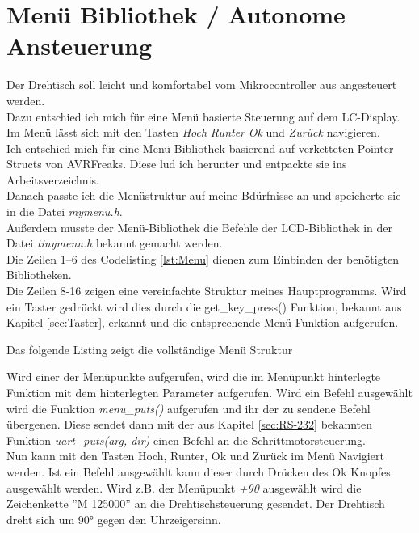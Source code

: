 \section{Menü Bibliothek / Autonome Ansteuerung}
Der Drehtisch soll leicht und komfortabel vom Mikrocontroller aus angesteuert werden.\\
Dazu entschied ich mich für eine Menü basierte Steuerung auf dem LC-Display. Im Menü lässt sich mit den Tasten \emph{Hoch} \emph{Runter} \emph{Ok} und \emph{Zurück} navigieren.\\
Ich entschied mich für eine Menü Bibliothek basierend auf verketteten Pointer Structs von AVRFreaks\cite{AVRFreaks:Menu}. Diese lud ich herunter und entpackte sie ins Arbeitsverzeichnis.\\
Danach passte ich die Menüstruktur auf meine Bdürfnisse an und speicherte sie in die Datei \emph{mymenu.h}.\\
Außerdem musste der Menü-Bibliothek die Befehle der LCD-Bibliothek in der Datei \emph{tinymenu.h} bekannt gemacht werden.\\
Die Zeilen 1--6 des Codelisting \ref{lst:Menu} dienen zum Einbinden der benötigten Bibliotheken.\\
Die Zeilen 8-16 zeigen eine vereinfachte Struktur meines  Hauptprogramms. Wird ein Taster gedrückt wird dies durch die get\_key\_press() Funktion, bekannt aus Kapitel \ref{sec:Taster}, erkannt und die entsprechende Menü Funktion aufgerufen.
\lstset{language=C, basicstyle=\footnotesize, showstringspaces=false, tabsize=8}

Das folgende Listing zeigt die vollständige Menü Struktur
\lstset{language=C, basicstyle=\footnotesize, showstringspaces=false, tabsize=8}

Wird einer der Menüpunkte aufgerufen, wird die im Menüpunkt hinterlegte Funktion mit dem hinterlegten Parameter aufgerufen.
Wird ein Befehl ausgewählt wird die Funktion \emph{menu\_puts()} aufgerufen und ihr der zu sendene Befehl übergenen. Diese sendet dann mit der aus Kapitel \ref{sec:RS-232} bekannten Funktion \emph{uart\_puts(arg, dir)} einen Befehl an die Schrittmotorsteuerung.\\
Nun kann mit den Tasten Hoch, Runter, Ok und Zurück im Menü Navigiert werden. Ist ein Befehl ausgewählt kann dieser durch Drücken des Ok Knopfes ausgewählt werden. Wird z.B. der Menüpunkt \emph{+90} ausgewählt wird die Zeichenkette ''M 125000'' an die Drehtischsteuerung gesendet. Der Drehtisch dreht sich um 90° gegen den Uhrzeigersinn.

